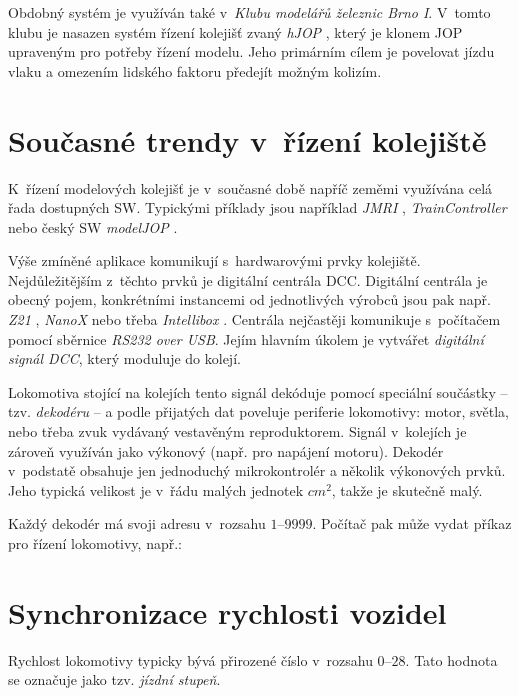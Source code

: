 Obdobný systém je využíván také v~\textit{Klubu modelářů železnic Brno I}.
V~tomto klubu je nasazen systém řízení kolejišť zvaný \textit{hJOP}
\cite{hjop:web}, který je klonem JOP upraveným pro potřeby řízení modelu. Jeho
primárním cílem je povelovat jízdu vlaku a omezením lidského faktoru předejít
možným kolizím.

\section{Současné trendy v~řízení kolejiště}

K~řízení modelových kolejišť je v~současné době napříč zeměmi využívána celá
řada dostupných SW. Typickými příklady jsou například \textit{JMRI}
\cite{jmri:web}, \textit{TrainController} \cite{traincontroller:web}
nebo český SW \textit{modelJOP} \cite{modeljop:web}.

Výše zmíněné aplikace komunikují s~hardwarovými prvky kolejiště.
Nejdůležitějším z~těchto prvků je digitální centrála DCC. Digitální centrála je
obecný pojem, konkrétními instancemi od jednotlivých výrobců jsou pak např.
\textit{Z21} \cite{z21:web}, \textit{NanoX} \cite{nanox:web} nebo třeba
\textit{Intellibox} \cite{intellibox:web}. Centrála nejčastěji komunikuje
s~počítačem pomocí sběrnice \textit{RS232 over USB}. Jejím hlavním úkolem je
vytvářet \textit{digitální signál DCC}, který moduluje do kolejí.

Lokomotiva stojící na kolejích tento signál dekóduje pomocí spe\-ciál\-ní
součástky -- tzv. \textit{dekodéru} -- a podle přijatých dat poveluje periferie
lokomotivy: motor, světla, nebo třeba zvuk vydávaný vestavěným reproduktorem.
Signál v~kolejích je zároveň využíván jako výkonový (např. pro napájení
motoru). Dekodér v~podstatě obsahuje jen jednoduchý mikrokontrolér a několik
výkonových prvků. Jeho typická velikost je v~řádu malých jednotek $cm^2$, takže
je skutečně malý.

Každý dekodér má svoji adresu v~rozsahu $1$--$9999$. Počítač pak může vydat příkaz
pro řízení lokomotivy, např.: \textit{}

\section{Synchronizace rychlosti vozidel}

Rychlost lokomotivy typicky bývá přirozené číslo v~rozsahu $0$--$28$. Tato
hodnota se označuje jako tzv. \textit{jízdní stupeň}.

